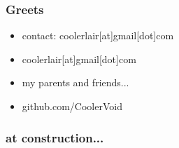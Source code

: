 \documentclass[serif,mathserif]{beamer}
\begin{document}

\begin{frame}
  \frametitle{Greets}
  \begin{itemize}
  \item contact: coolerlair[at]gmail[dot]com 
  \item coolerlair[at]gmail[dot]com
  \item my parents and friends...
  \item github.com/CoolerVoid
  \end{itemize}
\end{frame}

\begin{frame}
  \frametitle{at construction...}
\end{frame}
\end{document}
